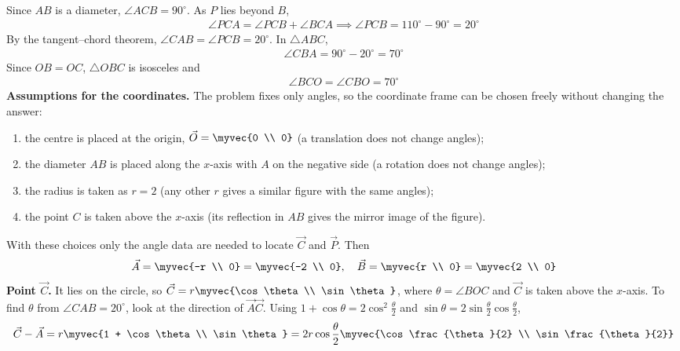 \begin{enumerate}[label=\thesubsection.\arabic*, ref=\thesubsection.\theenumi]
\solution
Since $AB$ is a diameter, $\angle ACB = 90^\circ$. As $P$ lies beyond $B$,
\begin{align}
	\angle PCA = \angle PCB + \angle BCA \implies \angle PCB = 110^\circ - 90^\circ = 20^\circ
\end{align}
By the tangent--chord theorem, $\angle CAB = \angle PCB = 20^\circ$. In $\triangle ABC$,
\begin{align}
	\angle CBA = 90^\circ - 20^\circ = 70^\circ
\end{align}
Since $OB = OC$, $\triangle OBC$ is isosceles and
\begin{align}
	\angle BCO = \angle CBO = 70^\circ
\end{align}
\textbf{Assumptions for the coordinates.} The problem fixes only angles, so the coordinate frame can be chosen freely without changing the answer:
\begin{enumerate}[label=(\roman*)]
	\item the centre is placed at the origin, $\vec{O} = \myvec{0 \\ 0}$ (a translation does not change angles);
	\item the diameter $AB$ is placed along the $x$-axis with $A$ on the negative side (a rotation does not change angles);
	\item the radius is taken as $r = 2$ (any other $r$ gives a similar figure with the same angles);
	\item the point $C$ is taken above the $x$-axis (its reflection in $AB$ gives the mirror image of the figure).
\end{enumerate}
With these choices only the angle data are needed to locate $\vec{C}$ and $\vec{P}$. Then
\begin{align}
	\vec{A} = \myvec{-r \\ 0} = \myvec{-2 \\ 0}, \quad \vec{B} = \myvec{r \\ 0} = \myvec{2 \\ 0}
\end{align}
\textbf{Point $\vec{C}$.} It lies on the circle, so $\vec{C} = r\myvec{\cos\theta \\ \sin\theta}$, where $\theta = \angle BOC$ and $\vec{C}$ is taken above the $x$-axis. To find $\theta$ from $\angle CAB = 20^\circ$, look at the direction of $\vec{A}\vec{C}$. Using $1 + \cos\theta = 2\cos^2\frac{\theta}{2}$ and $\sin\theta = 2\sin\frac{\theta}{2}\cos\frac{\theta}{2}$,
\begin{align}
	\vec{C} - \vec{A} = r\myvec{1 + \cos\theta \\ \sin\theta} = 2r\cos\frac{\theta}{2}\myvec{\cos\frac{\theta}{2} \\ \sin\frac{\theta}{2}}

\end{align}
\end{enumerate}
